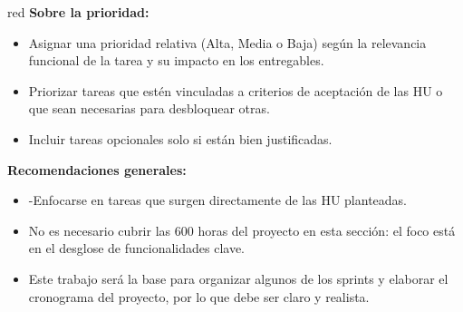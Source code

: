 \begin{consigna}{red}
\textbf{Sobre la prioridad:}
\begin{itemize}
  \item Asignar una prioridad relativa (Alta, Media o Baja) según la relevancia funcional de la tarea y su impacto en los entregables.
  \item Priorizar tareas que estén vinculadas a criterios de aceptación de las HU o que sean necesarias para desbloquear otras.
  \item Incluir tareas opcionales solo si están bien justificadas.
\end{itemize}

\textbf{Recomendaciones generales:}
\begin{itemize}
  \item -Enfocarse en tareas que surgen directamente de las HU planteadas.
  \item No es necesario cubrir las 600 horas del proyecto en esta sección: el foco está en el desglose de funcionalidades clave.
  \item Este trabajo será la base para organizar algunos de los sprints y elaborar el cronograma del proyecto, por lo que debe ser claro y realista.
\end{itemize}
\end{consigna}

